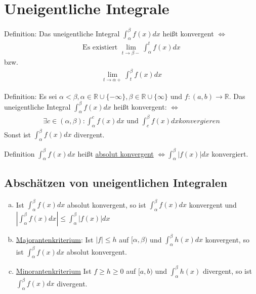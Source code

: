 \section{Uneigentliche Integrale}
Definition: Das uneigentliche Integral $\int_\alpha^\beta f(x)dx$ heißt konvergent $\Leftrightarrow$ 
\begin{align*}
    \text{Es existiert } \lim \limits_{t \to \beta -} \int_\alpha^t f(x)dx
\end{align*}
bzw.
\begin{align*}
    \lim \limits_{t \to \alpha +} \int_t^\beta f(x) dx
\end{align*}

Definition: Es sei $\alpha < \beta, \alpha \in \mathbb{R} \cup \{-\infty\}, \beta \in \mathbb{R} \cup \{\infty\}$ und 
$f:(a,b) \to \mathbb{R}$. Das uneigentliche Integral $\int_\alpha^\beta f(x) dx$ heißt konvergent: $\Leftrightarrow$
\begin{align*}
    \exists c \in (\alpha, \beta): \int_\alpha^c f(x)dx \text{ und } \int_c^\beta f(x)dx konvergieren
\end{align*}
Sonst ist $\int_\alpha^\beta f(x)dx$ divergent.

Definition $\int_\alpha^\beta f(x)dx$ heißt \underline{absolut konvergent} $\Leftrightarrow \int_\alpha^\beta |f(x)| dx$ konvergiert.

\subsection{Abschätzen von uneigentlichen Integralen}
\begin{enumerate} [a)]
    \item Ist $\int_\alpha^\beta f(x) dx$ absolut konvergent, so ist $\int_\alpha^\beta f(x) dx$ konvergent und 
    $|\int_\alpha^\beta f(x) dx| \leq \int_\alpha^\beta |f(x)| dx$
    \item \underline{Majorantenkriterium}: Ist $|f| \leq h$ auf $[\alpha,\beta)$ und $\int_\alpha^\beta h(x)dx$ konvergent, so ist
    $\int_\alpha^\beta f(x)dx$ absolut konvergent.
    \item \underline{Minorantenkriterium} Ist $f\geq h \geq 0$ auf $[a,b)$ und $\int_\alpha^\beta h(x)$ divergent, so ist 
    $\int_\alpha^\beta f(x)dx$ divergent.
\end{enumerate}
